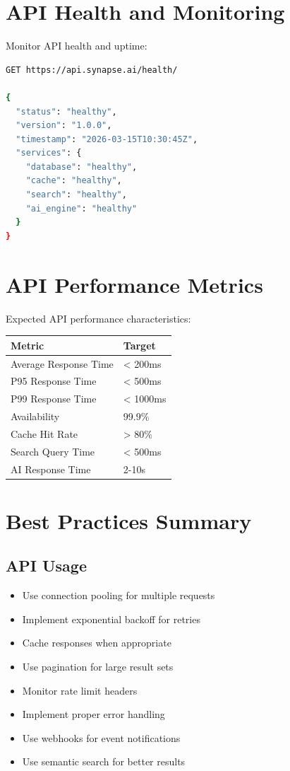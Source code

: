 \documentclass{report}
\begin{document}
\section{API Health and Monitoring}

Monitor API health and uptime:

\begin{lstlisting}[language=bash]
GET https://api.synapse.ai/health/

{
  "status": "healthy",
  "version": "1.0.0",
  "timestamp": "2026-03-15T10:30:45Z",
  "services": {
    "database": "healthy",
    "cache": "healthy",
    "search": "healthy",
    "ai_engine": "healthy"
  }
}
\end{lstlisting}

\section{API Performance Metrics}

Expected API performance characteristics:

\begin{center}
\begin{tabular}{ll}
\toprule
\textbf{Metric} & \textbf{Target} \\
\midrule
Average Response Time & < 200ms \\
P95 Response Time & < 500ms \\
P99 Response Time & < 1000ms \\
Availability & 99.9\% \\
Cache Hit Rate & > 80\% \\
Search Query Time & < 500ms \\
AI Response Time & 2-10s \\
\bottomrule
\end{tabular}
\end{center}

\section{Best Practices Summary}

\subsection{API Usage}

\begin{itemize}
    \item Use connection pooling for multiple requests
    \item Implement exponential backoff for retries
    \item Cache responses when appropriate
    \item Use pagination for large result sets
    \item Monitor rate limit headers
    \item Implement proper error handling
    \item Use webhooks for event notifications
    \item Use semantic search for better results
\end{itemize}
\end{document}
